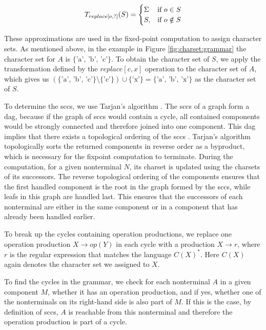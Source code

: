 \begin{align}
	\centering
	T_{replace[o, ?]}(S) = 
	\begin{cases}
		\Sigma & \text{if } o \in S\\
		S, & \text{if } o \notin S
	\end{cases}
	\label{math:replace:unknown}
\end{align}

These approximations are used in the fixed-point computation to assign character sets.
As mentioned above, in the example in Figure \ref{fig:charset:grammar} the character set for $A$ is $\{\text{'a', 'b', 'c'}\}$. To obtain the character set of $S$, we apply the transformation defined by the $replace[c,x]$ operation to the character set of $A$, which gives us $(\{\text{'a', 'b', 'c'}\} \setminus \{\text{'c'}\}) \cup \{\text{'x'}\} = \{\text{'a', 'b', 'x'}\}$ as the character set of $S$.

To determine the \acp{scc}, we use Tarjan's algorithm \cite{tarjan}.
The \acp{scc} of a graph form a \ac{dag}, because if the graph of \acp{scc} would contain a cycle, all contained components would be strongly connected and therefore joined into one component. This \ac{dag} implies that there exists a topological ordering of the \acp{scc} \cite{mit_algorithms}.
Tarjan's algorithm topologically sorts the returned components in reverse order as a byproduct, which is necessary for the fixpoint computation to terminate.
During the computation, for a given nonterminal $N$, its charset is updated using the charsets of its successors. The reverse topological ordering of the components ensures that the first handled component is the root in the graph formed by the \acp{scc}, while leafs in this graph are handled last. This ensures that the successors of each nonterminal are either in the same component or in a component that has already been handled earlier.

To break up the cycles containing operation productions, we replace one operation production $X \rightarrow op(Y)$ in each cycle with a production $X \rightarrow r$, where $r$ is the regular expression that matches the language $C(X)^*$. Here $C(X)$ again denotes the character set we assigned to $X$.

To find the cycles in the grammar, we check for each nonterminal $A$ in a given component $M$, whether it has an operation production, and if yes, whether one of the nonterminals on its right-hand side is also part of $M$. If this is the case, by definition of \acp{scc}, $A$ is reachable from this nonterminal and therefore the operation production is part of a cycle.

